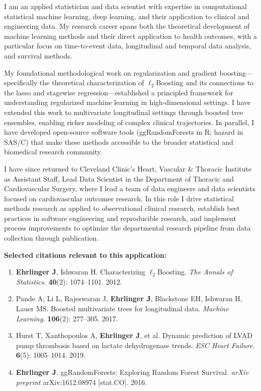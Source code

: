 \documentclass{nihbiosketch}
\begin{document}
\begin{statement}
I am an applied statistician and data scientist with expertise in computational
statistical machine learning, deep learning, and their application to clinical
and engineering data. My research career spans both the theoretical development
of machine learning methods and their direct application to health outcomes,
with a particular focus on time-to-event data, longitudinal and temporal data
analysis, and survival methods.

My foundational methodological work on regularization and gradient
boosting---specifically the theoretical characterization of
$\ell_2$Boosting and its connections to the lasso and stagewise
regression---established a principled framework for understanding regularized
machine learning in high-dimensional settings. I have extended this work to
multivariate longitudinal settings through boosted tree ensembles, enabling
richer modeling of complex clinical trajectories. In parallel, I have developed
open-source software tools (ggRandomForests in R; hazard in SAS/C) that make these methods
accessible to the broader statistical and biomedical research community.

I have since returned to Cleveland Clinic's Heart, Vascular \& Thoracic
Institute as Assistant Staff, Lead Data Scientist in the Department of
Thoracic and Cardiovascular Surgery, where I lead a team of data engineers
and data scientists focused on cardiovascular outcomes research. In this role I
drive statistical methods research as applied to observational clinical
research, establish best practices in software engineering and reproducible
research, and implement process improvements to optimize the departmental
research pipeline from data collection through publication.

\bigskip
\noindent\textbf{Selected citations relevant to this application:}

\begin{enumerate}

\item \textbf{Ehrlinger J}, Ishwaran H. Characterizing $\ell_2$Boosting.
\textit{The Annals of Statistics.} \textbf{40}(2): 1074--1101. 2012.

\item Pande A, Li L, Rajeswaran J, \textbf{Ehrlinger J}, Blackstone EH,
Ishwaran H, Lauer MS. Boosted multivariate trees for longitudinal data.
\textit{Machine Learning.} \textbf{106}(2): 277--305. 2017.

\item Hurst T, Xanthopoulos A, \textbf{Ehrlinger J}, et al. Dynamic
prediction of LVAD pump thrombosis based on lactate dehydrogenase trends.
\textit{ESC Heart Failure.} \textbf{6}(5): 1005--1014. 2019.

\item \textbf{Ehrlinger J}. ggRandomForests: Exploring Random Forest
Survival. \textit{arXiv preprint} arXiv:1612.08974 [stat.CO]. 2016.

\end{enumerate}
\end{statement}
\end{document}
